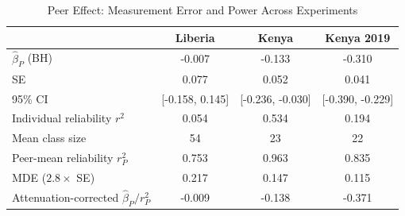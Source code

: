\begin{table}[htbp]
\centering\small
\caption{Peer Effect: Measurement Error and Power Across Experiments}
\label{tab:peer_attenuation}
\begin{tabular}{lccc}
\toprule
 & Liberia & Kenya & Kenya 2019 \\
\midrule
$\hat{\beta}_P$ (BH) & -0.007 & -0.133 & -0.310 \\
SE & 0.077 & 0.052 & 0.041 \\
95\% CI & [-0.158, 0.145] & [-0.236, -0.030] & [-0.390, -0.229] \\
Individual reliability $r^2$ & 0.054 & 0.534 & 0.194 \\
Mean class size & 54 & 23 & 22 \\
Peer-mean reliability $r^2_P$ & 0.753 & 0.963 & 0.835 \\
MDE ($2.8 \times$ SE) & 0.217 & 0.147 & 0.115 \\
Attenuation-corrected $\hat{\beta}_P / r^2_P$ & -0.009 & -0.138 & -0.371 \\
\bottomrule
\end{tabular}
\par\smallskip{}
\end{table}
